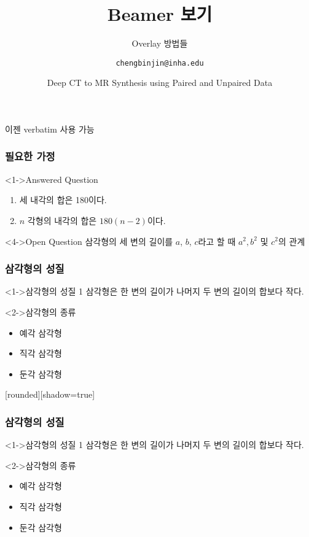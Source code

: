 \documentclass[xcolor=table]{beamer}
\title{Beamer 보기}
\subtitle{Overlay 방법들}
\author[김성빈]{\texttt{chengbinjin@inha.edu}}
\date[\today]{Deep CT to MR Synthesis using Paired and Unpaired Data}
\institute{INHA University}
\begin{document}
\begin{frame}
\titlepage
\end{frame}

\begin{frame}[fragile]
이젠 verbatim 사용 가능
\end{frame}

\begin{frame}[fragile]
\end{frame}

\begin{frame}
\frametitle{필요한 가정}
\begin{block}<1->{Answered Question}
\begin{enumerate}
\item<2-> 세 내각의 합은 180이다.
\item<3-> $n$ 각형의 내각의 합은 $180(n-2)$이다.
\end{enumerate}
\end{block}
\begin{block}<4->{Open Question}
삼각형의 세 변의 길이를 $a$, $b$, $c$라고 할 때 $a^2, b^2$ 및 $c^2$의 관계
\end{block}
\end{frame}

\begin{frame}
\frametitle{삼각형의 성질}
\begin{block}<1->{삼각형의 성질 1}
\alert{삼각형}은 한 변의 길이가 나머지 두 변의 길이의 합보다 작다.
\end{block}

\begin{block}<2->{삼각형의 종류}
\begin{itemize}
\item<2-> 예각 삼각형
\item<3-> 직각 삼각형
\item<4-> 둔각 삼각형
\end{itemize}
\end{block}
\end{frame}

[rounded][shadow=true]

\begin{frame}
\frametitle{삼각형의 성질}
\begin{block}<1->{삼각형의 성질 1}
\alert{삼각형}은 한 변의 길이가 나머지 두 변의 길이의 합보다 작다.
\end{block}

\begin{block}<2->{삼각형의 종류}
\begin{itemize}
\item<2-> 예각 삼각형
\item<3-> 직각 삼각형
\item<4-> 둔각 삼각형
\end{itemize}
\end{block}
\end{frame}
\end{document}
